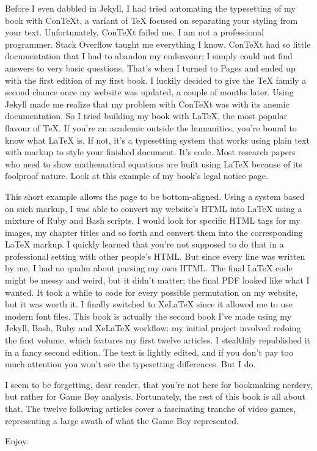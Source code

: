 \documentclass{book}
\begin{document}
Before I even dabbled in Jekyll, I had tried automating the typesetting of my book with ConTeXt, a variant of TeX focused on separating your styling from your text. Unfortunately, ConTeXt failed me. I am not a professional programmer. Stack Overflow taught me everything I know. ConTeXt had so little documentation that I had to abandon my endeavour; I simply could not find answers to very basic questions. That’s when I turned to Pages and ended up with the first edition of my first book. I luckily decided to give the TeX family a second chance once my website was updated, a couple of months later. Using Jekyll made me realize that my problem with ConTeXt was with its anemic documentation. So I tried building my book with LaTeX, the most popular flavour of TeX. If you’re an academic outside the humanities, you’re bound to know what LaTeX is. If not, it’s a typesetting system that works using plain text with markup to style your finished document. It’s code. Most research papers who need to show mathematical equations are built using LaTeX because of its foolproof nature. Look at this example of my book’s legal notice page.\par
{}\par
This short example allows the page to be bottom-aligned. Using a system based on such markup, I was able to convert my website’s HTML into LaTeX using a mixture of Ruby and Bash scripts. I would look for specific HTML tags for my images, my chapter titles and so forth and convert them into the corresponding LaTeX markup. I quickly learned that you’re not supposed to do that in a professional setting with other people’s HTML. But since every line was written by me, I had no qualm about parsing my own HTML. The final LaTeX code might be messy and weird, but it didn’t matter; the final PDF looked like what I wanted. It took a while to code for every possible permutation on my website, but it was worth it. I finally switched to XeLaTeX since it allowed me to use modern font files. This book is actually the second book I’ve made using my Jekyll, Bash, Ruby and XeLaTeX workflow: my initial project involved redoing the first volume, which features my first twelve articles. I stealthily republished it in a fancy second edition. The text is lightly edited, and if you don’t pay too much attention you won’t see the typesetting differences. But I do.\par
I seem to be forgetting, dear reader, that you’re not here for bookmaking nerdery, but rather for Game Boy analysis. Fortunately, the rest of this book is all about that. The twelve following articles cover a fascinating tranche of video games, representing a large swath of what the Game Boy represented.\par
Enjoy.\par
\end{document}
